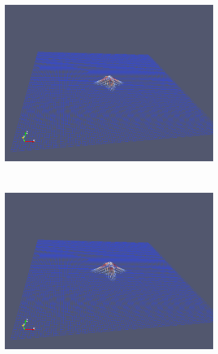 \begin{figure}[H]
\begin{subfigure}[t]{0.5\textwidth}
        \includegraphics[width=\textwidth]{img/fiber/density_1_radius_1_amplitude_0.1/3.png}
    \end{subfigure}%
    ~
    \begin{subfigure}[t]{0.5\textwidth}
        \centering
        \includegraphics[width=\textwidth]{img/fiber/density_1_radius_1_amplitude_0.1/4.png}
    \end{subfigure}
    ~
    \begin{subfigure}[t]{0.5\textwidth}
        \centering

\end{subfigure}
\end{figure}
